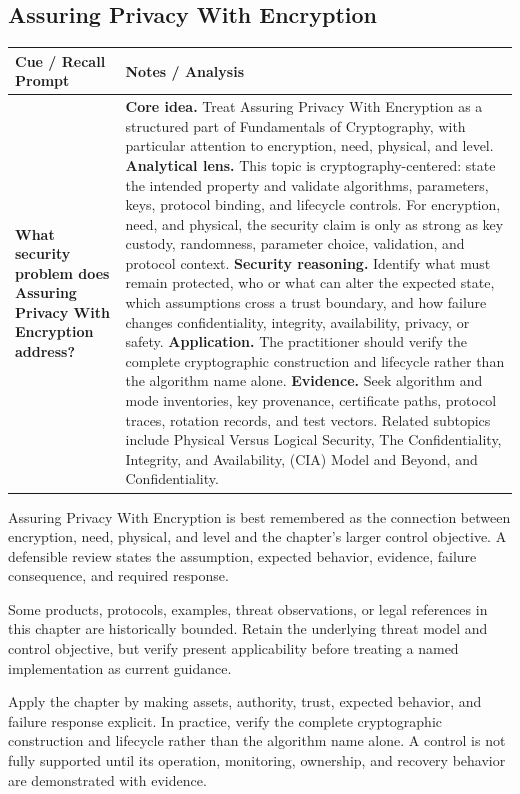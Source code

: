 \documentclass[11pt]{article}
\newcommand{\CornellHeader}{%
\rowcolor{Navy}\color{white}\bfseries Cue / Recall Prompt & \color{white}\bfseries Notes / Analysis\\\hline}
\newcommand{\CornellRow}[2]{%
\cellcolor{CueGray}\RaggedRight\textbf{#1} & \RaggedRight #2\\\hline}
\begin{document}
\subsection*{Assuring Privacy With Encryption}
\begin{longtable}{>{\RaggedRight\arraybackslash}p{}|>{\RaggedRight\arraybackslash}p{}}
\CornellHeader
\CornellRow{What security problem does Assuring Privacy With Encryption address?}{\textbf{Core idea.} Treat Assuring Privacy With Encryption as a structured part of Fundamentals of Cryptography, with particular attention to encryption, need, physical, and level. \textbf{Analytical lens.} This topic is cryptography-centered: state the intended property and validate algorithms, parameters, keys, protocol binding, and lifecycle controls. For encryption, need, and physical, the security claim is only as strong as key custody, randomness, parameter choice, validation, and protocol context. \textbf{Security reasoning.} Identify what must remain protected, who or what can alter the expected state, which assumptions cross a trust boundary, and how failure changes confidentiality, integrity, availability, privacy, or safety. \textbf{Application.} The practitioner should verify the complete cryptographic construction and lifecycle rather than the algorithm name alone. \textbf{Evidence.} Seek algorithm and mode inventories, key provenance, certificate paths, protocol traces, rotation records, and test vectors. Related subtopics include Physical Versus Logical Security, The Confidentiality, Integrity, and Availability, (CIA) Model and Beyond, and Confidentiality.}
\end{longtable}
\begin{topicsummary}
Assuring Privacy With Encryption is best remembered as the connection between encryption, need, physical, and level and the chapter's larger control objective. A defensible review states the assumption, expected behavior, evidence, failure consequence, and required response.
\end{topicsummary}
\begin{historybox}
Some products, protocols, examples, threat observations, or legal references in this chapter are historically bounded. Retain the underlying threat model and control objective, but verify present applicability before treating a named implementation as current guidance.
\end{historybox}
\begin{defensebox}
Apply the chapter by making assets, authority, trust, expected behavior, and failure response explicit. In practice, verify the complete cryptographic construction and lifecycle rather than the algorithm name alone. A control is not fully supported until its operation, monitoring, ownership, and recovery behavior are demonstrated with evidence.
\end{defensebox}
\end{document}
